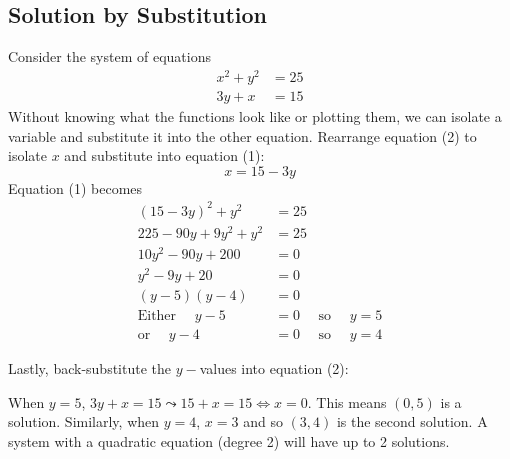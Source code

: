 \subsection*{Solution by Substitution}
 \example Consider the system of equations
 \begin{align}x^{2} +y^{2} &  = 25 \tag{1} \\
 3 y +x &  = 15 \tag{2}\end{align}
 \solution Without knowing what the functions look like or plotting them, we can isolate a variable and substitute it into the other equation. Rearrange equation (2) to isolate $x$ and substitute into equation (1):
$$x =  15 -3 y $$
 Equation (1) becomes
 \begin{align*}(15-3y)^2+y^2 &  =  25 \tag{expand and simplify}\\
 225-90y+9y^2+y^2&=25\\
 10 y^{2} -90 y +200 &  =  0 \tag{divide by 10}\\
 y^{2} -9 y +20 &  = 0 \tag{factor the quadratic}\\
 \left (y -5\right ) \left (y -4\right ) &  =  0 \\
 \text{Either }\quad y -5 &  =  0\quad\text{ so }\quad y =5 \\
 \text{or }\quad y -4 &  =  0\quad\text{ so }\quad y =4\end{align*}
 
Lastly, back-substitute the $y-$values into equation (2): 
 
 When $y =5$, $3 y +x =15 \leadsto 15 +x =15 \Longleftrightarrow x =0$. This means $\left (0 ,5\right )$ is a solution. Similarly, when $y =4$, $x =3$ and so $(3 ,4)$ is the second solution. A system with a quadratic equation (degree 2) will have up to 2 solutions.
 
